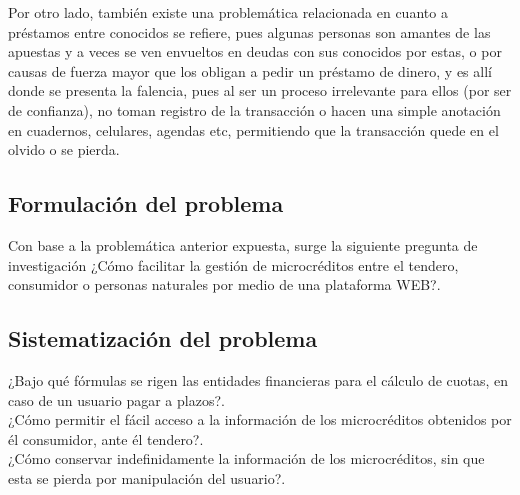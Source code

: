{	Por otro lado, también existe una problemática relacionada en cuanto a préstamos entre conocidos se refiere, pues algunas personas son amantes de las apuestas y a veces se ven envueltos en deudas con sus conocidos por estas, o por causas de fuerza mayor que los obligan a pedir un préstamo de dinero, y es allí donde se presenta la falencia, pues al ser un proceso irrelevante para ellos (por ser de confianza), no toman registro de la transacción o hacen una simple anotación en cuadernos, celulares, agendas etc, permitiendo que la transacción quede en el olvido o se pierda.}

	\subsection{Formulación del problema}
	
	{Con base a la problemática anterior expuesta, surge la siguiente pregunta de investigación ¿Cómo facilitar la gestión de microcréditos entre el tendero, consumidor o personas naturales por medio de una plataforma WEB?.}
	
	\subsection{Sistematización del problema}
	
	{¿Bajo qué fórmulas se rigen las entidades financieras para el cálculo de cuotas, en caso de un usuario pagar a plazos?.\\
		
	¿Cómo permitir el fácil acceso a la información de los microcréditos obtenidos por él consumidor, ante él tendero?.\\
	
	¿Cómo conservar indefinidamente la información de los microcréditos, sin que esta se pierda por manipulación del usuario?.}